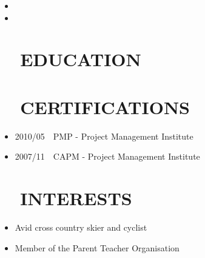 \documentclass[a4paper, 12pt]{classycv}
\begin{document}
\begin{resume}
\begin{rightpart}
        \begin{block}
            \begin{itemize}
                \item\Blindtext[1][1]
                \item\Blindtext[1][1]
            \end{itemize}
        \end{block}

        \section{\faGraduationCap~~\MakeUppercase{Education}}
        \begin{block}

        \end{block}

        \section{\faCertificate~~\MakeUppercase{Certifications}}
        \begin{block}
            \begin{itemize}
                \item 2010/05~~PMP - Project Management Institute
                \item 2007/11~~CAPM - Project Management Institute
            \end{itemize}
        \end{block}

        \section{\faSoccerBallO~~\MakeUppercase{Interests}}
        \begin{block}
            \begin{itemize}
                \item Avid cross country skier and cyclist
                \item Member of the Parent Teacher Organisation
            \end{itemize}
        \end{block}
    \end{rightpart}
\end{resume}

%
%
\end{document}
